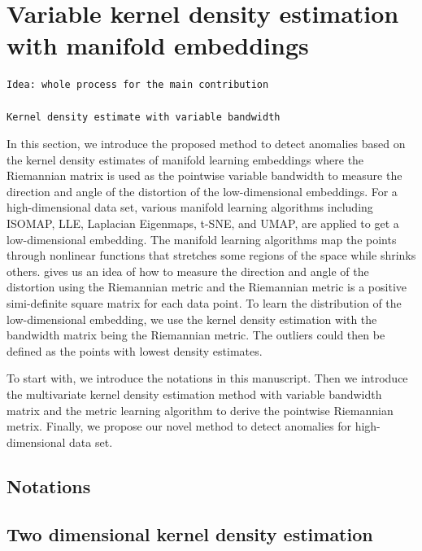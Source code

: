 \documentclass[11pt,a4paper,]{article}
\begin{document}
\hypertarget{vkde}{%
\section{Variable kernel density estimation with manifold embeddings}\label{vkde}}

\begin{verbatim}
Idea: whole process for the main contribution

Kernel density estimate with variable bandwidth
\end{verbatim}

In this section, we introduce the proposed method to detect anomalies based on the kernel density estimates of manifold learning embeddings where the Riemannian matrix is used as the pointwise variable bandwidth to measure the direction and angle of the distortion of the low-dimensional embeddings. For a high-dimensional data set, various manifold learning algorithms including ISOMAP, LLE, Laplacian Eigenmaps, t-SNE, and UMAP, are applied to get a low-dimensional embedding. The manifold learning algorithms map the points through nonlinear functions that stretches some regions of the space while shrinks others. \textcite{Perrault-Joncas2013-pq} gives us an idea of how to measure the direction and angle of the distortion using the Riemannian metric and the Riemannian metric is a positive simi-definite square matrix for each data point. To learn the distribution of the low-dimensional embedding, we use the kernel density estimation with the bandwidth matrix being the Riemannian metric. The outliers could then be defined as the points with lowest density estimates.

To start with, we introduce the notations in this manuscript. Then we introduce the multivariate kernel density estimation method with variable bandwidth matrix and the metric learning algorithm to derive the pointwise Riemannian metrix. Finally, we propose our novel method to detect anomalies for high-dimensional data set.

\hypertarget{notations}{%
\subsection{Notations}\label{notations}}

\hypertarget{two-dimensional-kernel-density-estimation}{%
\subsection{Two dimensional kernel density estimation}\label{two-dimensional-kernel-density-estimation}}
\end{document}
